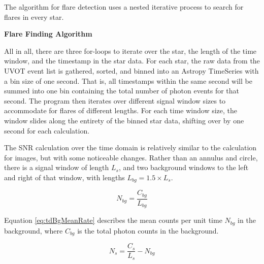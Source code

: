 \documentclass{article}
\begin{document}
\begin{multicols}{2}
The algorithm for flare detection uses a nested iterative process to search for flares in every star. 

\noindent\makebox[\linewidth]{\rule{\columnwidth}{0.4pt}} 
\textbf{Flare Finding Algorithm}

\begin{algorithmic}
        \ENDFOR
    \ENDFOR
\ENDFOR
\end{algorithmic}

\noindent\makebox[\linewidth]{\rule{\columnwidth}{0.4pt}}

All in all, there are three for-loops to iterate over the star, the length of the time window, and the timestamp in the star data. For each star, the raw data from the UVOT event list is gathered, sorted, and binned into an Astropy TimeSeries with a bin size of one second. That is, all timestamps within the same second will be summed into one bin containing the total number of photon events for that second. The program then iterates over different signal window sizes to accommodate for flares of different lengths. For each time window size, the window slides along the entirety of the binned star data, shifting over by one second for each calculation.

The SNR calculation over the time domain is relatively similar to the calculation for images, but with some noticeable changes. Rather than an annulus and circle, there is a signal window of length \(L_s\), and two background windows to the left and right of that window, with lengths \(L_{bg} = 1.5 \times L_s\). 

\begin{equation} \label{eq:tdBgMeanRate}
    N_{bg} = \frac{C_{bg}}{L_{bg}}
\end{equation}

Equation \ref{eq:tdBgMeanRate} describes the mean counts per unit time \(N_{bg}\) in the background, where \(C_{bg}\) is the total photon counts in the background. 

\begin{equation} \label{eq:tdSigMeanRate}
    N_s = \frac{C_s}{L_s} - N_{bg}
\end{equation}


\end{multicols}
\end{document}
